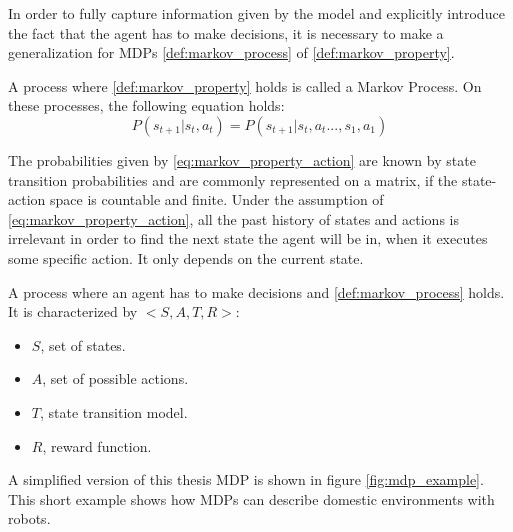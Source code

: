 In order to fully capture information given by the model and
explicitly introduce the fact that the agent has to make decisions, it is
necessary to make a generalization for \glspl{MDP} \ref{def:markov_process} of
\ref{def:markov_property}.

\begin{definition}
    A process where \ref{def:markov_property} holds is called a Markov Process.
    On these processes, the following equation holds:
    \begin{equation}
        P(s_{t+1}|s_{t}, a_{t}) = P(s_{t+1}|s_{t},a_{t}...,s_1, a_1)
        \label{eq:markov_property_action}
    \end{equation}
    \label{def:markov_process}
\end{definition}

The probabilities given by \ref{eq:markov_property_action} are known by state
transition probabilities and are commonly represented on a matrix, if the
state-action space is countable and finite. Under the assumption of
\ref{eq:markov_property_action}, all the past history of states and actions is
irrelevant in order to find the next state the agent will be in, when it
executes some specific action. It only depends on the current state.

\begin{definition}
    A process where an agent has to make decisions and \ref{def:markov_process}
    holds. It is characterized by $<S, A, T, R>$:
    \begin{itemize}
        \item $S$, set of states.
        \item $A$, set of possible actions.
        \item $T$, state transition model.
        \item $R$, reward function.
    \end{itemize}
\end{definition}

A simplified version of this thesis \gls{MDP} is shown in figure
\ref{fig:mdp_example}. This short example shows how \glspl{MDP} can describe
domestic environments with robots.

